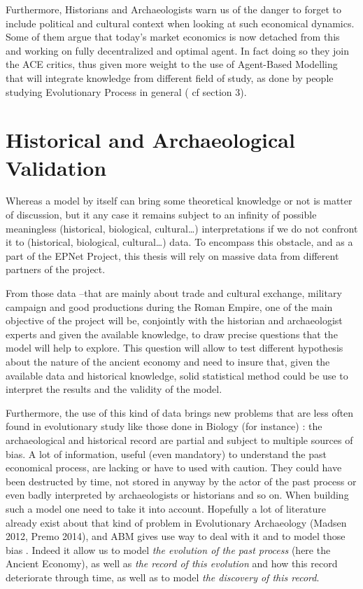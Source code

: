 \documentclass[a4paper]{article}
\begin{document}
Furthermore, Historians and Archaeologists warn us of the danger to forget to include political and cultural context when looking at such economical dynamics. Some of them argue that today's market economics is now detached from this and working on fully decentralized and optimal agent. In fact doing so they join the ACE critics, thus given more weight to the use of Agent-Based Modelling that will integrate knowledge from different field of study, as done by people studying Evolutionary Process in general ( cf section 3).


\section{Historical and Archaeological Validation}

Whereas a model by itself can bring some theoretical knowledge or not is matter of discussion, but it any case it remains subject to an infinity of possible meaningless (historical, biological, cultural\ldots) interpretations if we do not confront it to (historical, biological, cultural\ldots) data. To encompass this obstacle, and as a part of the EPNet Project, this thesis will rely on massive data from different partners of the project. 

From those data --that are mainly about trade and cultural exchange, military campaign and good productions during the Roman Empire, one of the main objective of the project will be, conjointly with the historian and archaeologist experts and given the available knowledge, to draw precise questions that the model will help to explore. This question will allow to test different hypothesis about the nature of the ancient economy and need to insure that, given the available data and historical knowledge, solid statistical method could be use to interpret the results and the validity of the model.

Furthermore, the use of this kind of data brings new problems that are less often found in evolutionary study like those done in Biology (for instance) :  the archaeological and historical record are partial and subject to multiple sources of bias. A lot of information, useful (even mandatory) to understand the past economical process, are lacking or have to used with caution. They could have been destructed by time, not stored in anyway by the actor of the past process or even badly interpreted by archaeologists or historians and so on. When building such a model one need to take it into account. Hopefully a lot of literature already exist about that kind of problem in Evolutionary Archaeology (Madsen 2012, Premo 2014), and ABM gives use way to deal with it and to model those bias \citep{rubiocampillo2012simulatingarchaeologist}. Indeed it allow us to model \emph{the evolution of the past process} (here the Ancient Economy), as well as \emph{the record of this evolution} and how this record deteriorate through time, as well as to model \emph{the discovery of this record}.
\end{document}
